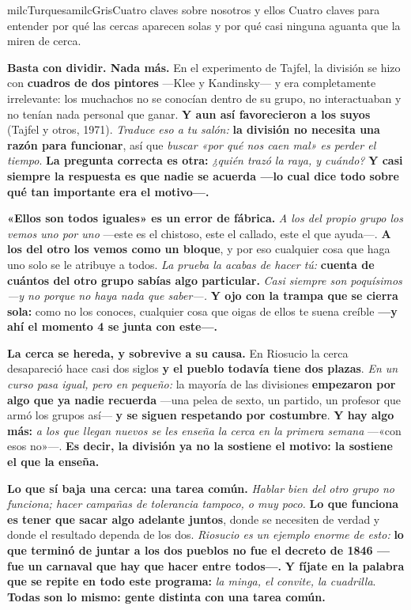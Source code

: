 \documentclass[11pt,letterpaper]{article}
\newcommand{\milcpaso}[3]{%
\Needspace{4\baselineskip}%
\begin{tcolorbox}[enhanced,colback=white,colframe=milcLinea,arc=1.5mm,boxrule=.9pt,
  left=14mm,right=4mm,top=3mm,bottom=3mm,before skip=4pt,after skip=4pt,
  fontupper=\RaggedRight,
  overlay={\node[anchor=north west,circle,fill=#2,text=white,inner sep=0pt,
    minimum size=7.4mm,font=\sffamily\bfseries\small]
    at ([xshift=3.6mm,yshift=-3.2mm]frame.north west) {#1};}]
#3
\end{tcolorbox}}
\begin{document}
\begin{softbox}{milcTurquesa}{milcGris}{Cuatro claves sobre nosotros y ellos}
Cuatro claves para entender por qué las cercas aparecen solas y por qué casi ninguna aguanta que la miren de cerca.
\end{softbox}

\milcpaso{1}{milcTurquesa}{\textbf{Basta con dividir. Nada más.} En el experimento de Tajfel, la división se hizo con \textbf{cuadros de dos pintores} ---Klee y Kandinsky--- y era completamente irrelevante: los muchachos no se conocían dentro de su grupo, no interactuaban y no tenían nada personal que ganar. \textbf{Y aun así favorecieron a los suyos} (Tajfel y otros, 1971). \emph{Traduce eso a tu salón:} \textbf{la división no necesita una razón para funcionar}, así que \emph{buscar «por qué nos caen mal» es perder el tiempo}. \textbf{La pregunta correcta es otra:} \emph{¿quién trazó la raya, y cuándo?} \textbf{Y casi siempre la respuesta es que nadie se acuerda ---lo cual dice todo sobre qué tan importante era el motivo---.}}
\milcpaso{2}{milcTurquesa}{\textbf{«Ellos son todos iguales» es un error de fábrica.} \emph{A los del propio grupo los vemos uno por uno} ---este es el chistoso, este el callado, este el que ayuda---. \textbf{A los del otro los vemos como un bloque}, y por eso cualquier cosa que haga uno solo se le atribuye a todos. \emph{La prueba la acabas de hacer tú:} \textbf{cuenta de cuántos del otro grupo sabías algo particular.} \emph{Casi siempre son poquísimos ---y no porque no haya nada que saber---.} \textbf{Y ojo con la trampa que se cierra sola:} como no los conoces, cualquier cosa que oigas de ellos te suena creíble \textbf{---y ahí el momento 4 se junta con este---.}}
\milcpaso{3}{milcTurquesa}{\textbf{La cerca se hereda, y sobrevive a su causa.} En Riosucio la cerca desapareció hace casi dos siglos \textbf{y el pueblo todavía tiene dos plazas}. \emph{En un curso pasa igual, pero en pequeño:} la mayoría de las divisiones \textbf{empezaron por algo que ya nadie recuerda} ---una pelea de sexto, un partido, un profesor que armó los grupos así--- \textbf{y se siguen respetando por costumbre}. \textbf{Y hay algo más:} \emph{a los que llegan nuevos se les enseña la cerca en la primera semana} ---«con esos no»---. \textbf{Es decir, la división ya no la sostiene el motivo: la sostiene el que la enseña.}}
\milcpaso{4}{milcTurquesa}{\textbf{Lo que sí baja una cerca: una tarea común.} \emph{Hablar bien del otro grupo no funciona; hacer campañas de tolerancia tampoco, o muy poco.} \textbf{Lo que funciona es tener que sacar algo adelante juntos}, donde se necesiten de verdad y donde el resultado dependa de los dos. \emph{Riosucio es un ejemplo enorme de esto:} \textbf{lo que terminó de juntar a los dos pueblos no fue el decreto de 1846 ---fue un carnaval que hay que hacer entre todos---.} \textbf{Y fíjate en la palabra que se repite en todo este programa:} \emph{la minga, el convite, la cuadrilla}. \textbf{Todas son lo mismo: gente distinta con una tarea común.}}
\end{document}
